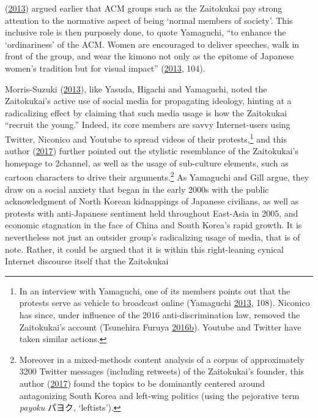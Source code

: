 \documentclass[10pt,british,A4paper,,openany]{memoir}
\begin{document}
(\protect\hyperlink{ref-yamaguchi_xenophobia_2013}{2013}) argued earlier
that ACM groups such as the Zaitokukai pay strong attention to the
normative aspect of being `normal members of society'. This inclusive
role is then purposely done, to quote Yamaguchi, ``to enhance the
`ordinariness' of the ACM. Women are encouraged to deliver speeches,
walk in front of the group, and wear the kimono not only as the epitome
of Japanese women's tradition but for visual impact''
(\protect\hyperlink{ref-yamaguchi_xenophobia_2013}{2013}, 104).

Morris-Suzuki
(\protect\hyperlink{ref-morris-suzuki_freedom_2013}{2013}), like Yasuda,
Higachi and Yamaguchi, noted the Zaitokukai's active use of social media
for propagating ideology, hinting at a radicalizing effect by claiming
that such media usage is how the Zaitokukai ``recruit the young.''
Indeed, its core members are savvy Internet-users using Twitter,
Niconico and Youtube to spread videos of their protests,\footnote{In an
  interview with Yamaguchi, one of its members points out that the
  protests serve as vehicle to broadcast online (Yamaguchi
  \protect\hyperlink{ref-yamaguchi_xenophobia_2013}{2013}, 108).
  Niconico has since, under influence of the 2016 anti-discrimination
  law, removed the Zaitokukai's account (Tsunehira Furuya
  \protect\hyperlink{ref-furuya_can_2016}{2016}\protect\hyperlink{ref-furuya_can_2016}{b}).
  Youtube and Twitter have taken similar actions.} and this author
(\protect\hyperlink{ref-poppe_digitaal_2017}{2017}) further pointed out
the stylistic resemblance of the Zaitokukai's homepage to 2channel, as
well as the usage of sub-culture elements, such as cartoon characters to
drive their arguments.\footnote{Moreover in a mixed-methods content
  analysis of a corpus of approximately 3200 Twitter messages (including
  retweets) of the Zaitokukai's founder, this author
  (\protect\hyperlink{ref-poppe_digitaal_2017}{2017}) found the topics
  to be dominantly centered around antagonizing South Korea and
  left-wing politics (using the pejorative term \emph{payoku} パヨク,
  `leftists').} As Yamaguchi and Gill argue, they draw on a social
anxiety that began in the early 2000s with the public acknowledgment of
North Korean kidnappings of Japanese civilians, as well as protests with
anti-Japanese sentiment held throughout East-Asia in 2005, and economic
stagnation in the face of China and South Korea's rapid growth. It is
nevertheless not just an outsider group's radicalizing usage of media,
that is of note. Rather, it could be argued that it is within this
right-leaning cynical Internet discourse itself that the Zaitokukai
\end{document}
